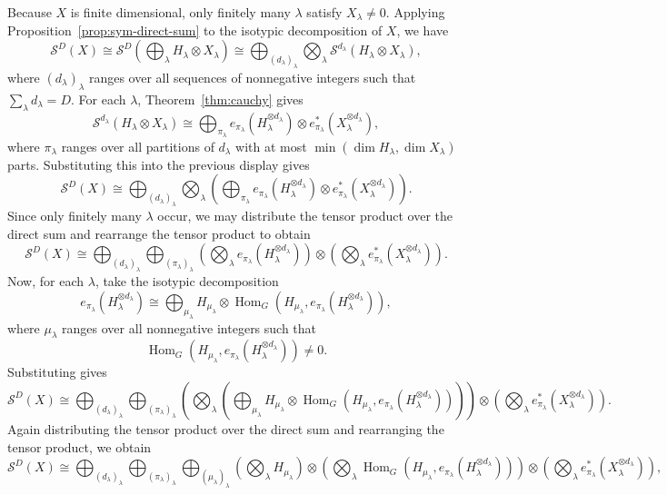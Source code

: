 \documentclass[11pt]{article}
\newcommand{\scS}{\mathcal{S}}
\newcommand{\HomG}[2]{\operatorname{Hom}_G\!\left(#1,#2\right)}
\theoremstyle{definition}
\begin{document}
Because $X$ is finite dimensional, only finitely many $\lambda$ satisfy $X_\lambda\neq 0$. Applying Proposition~\ref{prop:sym-direct-sum} to the isotypic decomposition of $X$, we have
\[
  \scS^D(X)
  \cong
  \scS^D\!\left(\bigoplus_\lambda H_\lambda\otimes X_\lambda\right)
  \cong
  \bigoplus_{(d_\lambda)_\lambda}
  \bigotimes_\lambda
  \scS^{d_\lambda}(H_\lambda\otimes X_\lambda),
\]
where $(d_\lambda)_\lambda$ ranges over all sequences of nonnegative integers such that $\sum_\lambda d_\lambda=D$. For each $\lambda$, Theorem~\ref{thm:cauchy} gives
\[
  \scS^{d_\lambda}(H_\lambda\otimes X_\lambda)
  \cong
  \bigoplus_{\pi_\lambda}
  e_{\pi_\lambda}(H_\lambda^{\otimes d_\lambda})\otimes e_{\pi_\lambda}^*(X_\lambda^{\otimes d_\lambda}),
\]
where $\pi_\lambda$ ranges over all partitions of $d_\lambda$ with at most $\min(\dim H_\lambda,\dim X_\lambda)$ parts. Substituting this into the previous display gives
\[
  \scS^D(X)
  \cong
  \bigoplus_{(d_\lambda)_\lambda}
  \bigotimes_\lambda
  \left(
  \bigoplus_{\pi_\lambda}
  e_{\pi_\lambda}(H_\lambda^{\otimes d_\lambda})\otimes e_{\pi_\lambda}^*(X_\lambda^{\otimes d_\lambda})
  \right).
\]
Since only finitely many $\lambda$ occur, we may distribute the tensor product over the direct sum and rearrange the tensor product to obtain
\[
  \scS^D(X)
  \cong
  \bigoplus_{(d_\lambda)_\lambda}
  \bigoplus_{(\pi_\lambda)_\lambda}
  \left(\bigotimes_\lambda e_{\pi_\lambda}(H_\lambda^{\otimes d_\lambda})\right)
  \otimes
  \left(\bigotimes_\lambda e_{\pi_\lambda}^*(X_\lambda^{\otimes d_\lambda})\right).
\]
Now, for each $\lambda$, take the isotypic decomposition
\[
  e_{\pi_\lambda}(H_\lambda^{\otimes d_\lambda})
  \cong
  \bigoplus_{\mu_\lambda}
  H_{\mu_\lambda}\otimes \HomG{H_{\mu_\lambda}}{e_{\pi_\lambda}(H_\lambda^{\otimes d_\lambda})},
\]
where $\mu_\lambda$ ranges over all nonnegative integers such that
\[
  \HomG{H_{\mu_\lambda}}{e_{\pi_\lambda}(H_\lambda^{\otimes d_\lambda})}\neq 0.
\]
Substituting gives
\[
  \scS^D(X)
  \cong
  \bigoplus_{(d_\lambda)_\lambda}
  \bigoplus_{(\pi_\lambda)_\lambda}
  \left(\bigotimes_\lambda
  \left(
  \bigoplus_{\mu_\lambda}
  H_{\mu_\lambda}\otimes \HomG{H_{\mu_\lambda}}{e_{\pi_\lambda}(H_\lambda^{\otimes d_\lambda})}
  \right)\right)
  \otimes
  \left(\bigotimes_\lambda e_{\pi_\lambda}^*(X_\lambda^{\otimes d_\lambda})\right).
\]
Again distributing the tensor product over the direct sum and rearranging the tensor product, we obtain
\[
  \scS^D(X)
  \cong
  \bigoplus_{(d_\lambda)_\lambda}
  \bigoplus_{(\pi_\lambda)_\lambda}
  \bigoplus_{(\mu_\lambda)_\lambda}
  \left(\bigotimes_\lambda H_{\mu_\lambda}\right)
  \otimes
  \left(\bigotimes_\lambda \HomG{H_{\mu_\lambda}}{e_{\pi_\lambda}(H_\lambda^{\otimes d_\lambda})}\right)
  \otimes
  \left(\bigotimes_\lambda e_{\pi_\lambda}^*(X_\lambda^{\otimes d_\lambda})\right),
\]
\end{document}
